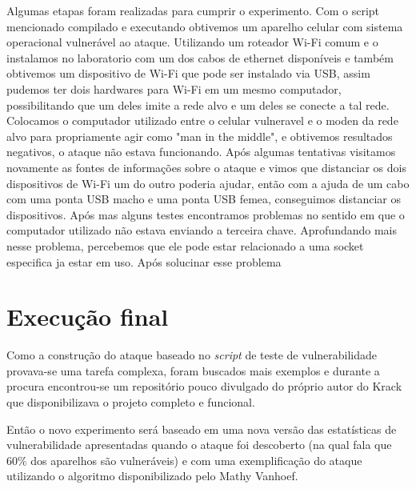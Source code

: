\documentclass[12pt]{article}
\begin{document}
Algumas etapas foram realizadas para cumprir o experimento. Com o script mencionado compilado e executando obtivemos um aparelho celular com sistema operacional vulnerável ao ataque. Utilizando um roteador Wi-Fi comum e o instalamos no laboratorio com um dos cabos de ethernet disponíveis e também obtivemos um dispositivo de Wi-Fi que pode ser instalado via USB, assim pudemos ter dois hardwares para Wi-Fi em um mesmo computador, possibilitando que um deles imite a rede alvo e um deles se conecte a tal rede. Colocamos o computador utilizado entre o celular vulneravel e o moden da rede alvo para propriamente agir como "man in the middle", e obtivemos resultados negativos, o ataque não estava funcionando. Após algumas tentativas visitamos novamente as fontes de informações sobre o ataque e vimos que distanciar os dois dispositivos de Wi-Fi um do outro poderia ajudar, então com a ajuda de um cabo com uma ponta USB macho e uma ponta USB femea, conseguimos distanciar os dispositivos. Após mas alguns testes encontramos problemas no sentido em que o computador utilizado não estava enviando a terceira chave. Aprofundando mais nesse problema, percebemos que ele pode estar relacionado a uma socket especifica ja estar em uso. Após solucinar esse problema

\section{Execução final}
Como a construção do ataque baseado no \textit{script} de teste de vulnerabilidade provava-se uma tarefa complexa, foram buscados mais exemplos e durante a procura encontrou-se um repositório pouco divulgado do próprio autor do Krack que disponibilizava o projeto completo e funcional.

Então o novo experimento será baseado em uma nova versão das estatísticas de vulnerabilidade apresentadas quando o ataque foi descoberto (na qual fala que 60\% dos aparelhos são vulneráveis) e com uma exemplificação do ataque utilizando o algoritmo disponibilizado pelo Mathy Vanhoef.












     
\end{document}
